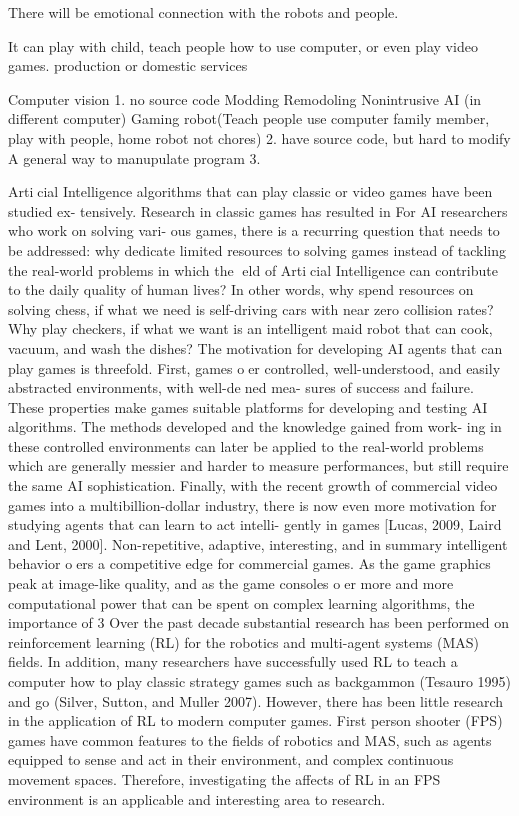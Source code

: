 There will be emotional connection with the robots and people. 

It can play with child,
teach people how to use computer, or even play video games. 
production or domestic services





Computer vision 
1. no source code
Modding
Remodoling
Nonintrusive AI (in different computer)
Gaming robot(Teach people use computer family member, play with people, home robot not chores)
2. have source code, but hard to modify
A general way to manupulate program
3. 



Articial Intelligence algorithms that can play classic or video games have been studied ex-
tensively. Research in classic games has resulted in  For AI researchers who work on solving vari-
ous games, there is a recurring question that needs to be addressed: why dedicate limited
resources to solving games instead of tackling the real-world problems in which the eld of
Articial Intelligence can contribute to the daily quality of human lives? In other words,
why spend resources on solving chess, if what we need is self-driving cars with near zero
collision rates? Why play checkers, if what we want is an intelligent maid robot that can
cook, vacuum, and wash the dishes?
The motivation for developing AI agents that can play games is threefold. First, games
oer controlled, well-understood, and easily abstracted environments, with well-dened mea-
sures of success and failure. These properties make games suitable platforms for developing
and testing AI algorithms. The methods developed and the knowledge gained from work-
ing in these controlled environments can later be applied to the real-world problems which
are generally messier and harder to measure performances, but still require the same AI
sophistication.
Finally, with the recent growth of commercial video games into a multibillion-dollar
industry, there is now even more motivation for studying agents that can learn to act intelli-
gently in games [Lucas, 2009, Laird and Lent, 2000]. Non-repetitive, adaptive, interesting,
and in summary intelligent behavior oers a competitive edge for commercial games. As
the game graphics peak at image-like quality, and as the game consoles oer more and more
computational power that can be spent on complex learning algorithms, the importance of
3
Over the past decade substantial research has been
performed on reinforcement learning (RL) for the robotics
and multi-agent systems (MAS) fields. In addition, many
researchers have successfully used RL to teach a computer
how to play classic strategy games such as backgammon
(Tesauro 1995) and go (Silver, Sutton, and Muller 2007).
However, there has been little research in the application of
RL to modern computer games. First person shooter (FPS)
games have common features to the fields of robotics and
MAS, such as agents equipped to sense and act in their
environment, and complex continuous movement spaces.
Therefore, investigating the affects of RL in an FPS
environment is an applicable and interesting area to
research.




